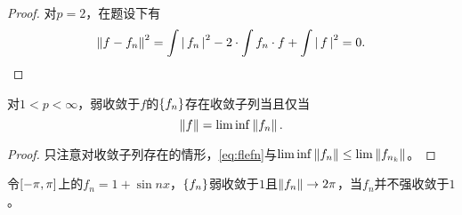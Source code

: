 \documentclass{ctexrep}
\begin{document}
  \begin{proof}
  对$p=2$，在题设下有
  \[ \left\| f-f_n \right\|^2 = \int \left|\, f_n \,\right|^2-2\cdot\int f_n\cdot f+\int\left|\, f \,\right|^2 = 0. \qedhere \]
  \end{proof}
  \begin{collary}
  对$1<p<\infty$，弱收敛于$f$的$\left\{f_n\right\}$存在收敛子列当且仅当
  \[ \left\| f \right\| = \lim\inf\left\| f_n \right\|. \]
  \end{collary}
  \begin{proof}
  只注意对收敛子列存在的情形，\eqref{eq:flefn}与$\lim\inf\left\| f_n \right\|\le\lim\left\| f_{n_k} \right\|$。
  \end{proof}
  \begin{ex}
  令$\left[-\pi,\pi\right]$上的$f_n=1+\sin nx$，$\left\{f_n\right\}$弱收敛于$1$且$\left\| f_n \right\|\rightarrow 2\pi$，当$f_n$并不强收敛于$1$。
  \end{ex}
  
  
 
\ifx\allfiles\undefined %
\end{document}
